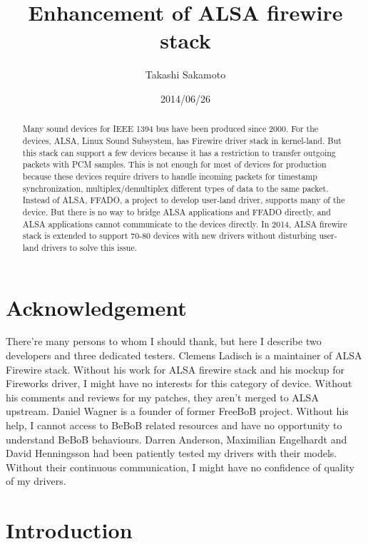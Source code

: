 \documentclass[onecolumn]{article}
\begin{document}
\title{Enhancement of ALSA firewire stack}
\author{Takashi Sakamoto}
\date{2014/06/26}
\maketitle{}

\begin{abstract}

Many sound devices for IEEE 1394 bus have been produced since 2000. For the devices, ALSA, Linux Sound Subsystem, has Firewire driver stack in kernel-land. But this stack can support a few devices because it has a restriction to transfer outgoing packets with PCM samples. This is not enough for most of devices for production because these devices require drivers to handle incoming packets for timestamp synchronization, multiplex/demultiplex different types of data to the same packet. Instead of ALSA, FFADO, a project to develop user-land driver, supports many of the device. But there is no way to bridge ALSA applications and FFADO directly, and ALSA applications cannot communicate to the devices directly. In 2014, ALSA firewire stack is extended to support 70-80 devices with new drivers without disturbing user-land drivers to solve this issue.

\end{abstract}

\section*{Acknowledgement}

There're many persons to whom I should thank, but here I describe two developers and three dedicated testers. Clemens Ladisch is a maintainer of ALSA Firewire stack. Without his work for ALSA firewire stack and his mockup for Fireworks driver, I might have no interests for this category of device. Without his comments and reviews for my patches, they aren't merged to ALSA upstream. Daniel Wagner is a founder of former FreeBoB project. Without his help, I cannot access to BeBoB related resources and have no opportunity to understand BeBoB behaviours. Darren Anderson, Maximilian Engelhardt and David Henningsson had been patiently tested my drivers with their models. Without their continuous communication, I might have no confidence of quality of my drivers.


\section{Introduction}
\end{document}
